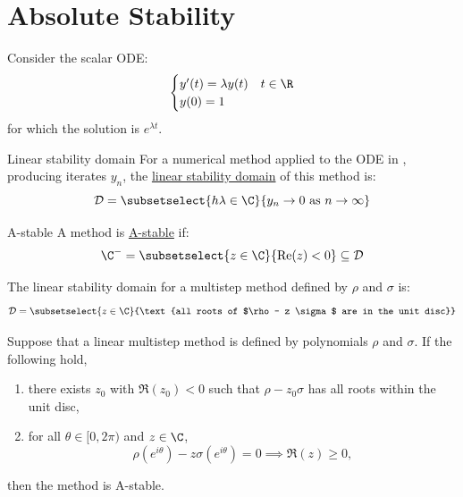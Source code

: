 \documentclass[../Main.tex]{subfiles}
\begin{document}
\section{Absolute Stability}
Consider the scalar ODE:
\begin{equation}
    \begin{cases}
        y'(t) = \lambda y(t) & t \in \R \\
        y(0) = 1 &
    \end{cases}
    \label{eqnScalarODE}
\end{equation}
for which the solution is $e^{\lambda t}$.
\begin{definition}{Linear stability domain}
    For a numerical method applied to the ODE in , producing iterates $y_n$, the \underline{linear stability domain} of this method is:
    \begin{equation*}
        \dom = \subsetselect{h\lambda \in \C}{y_n \to 0 \text{ as } n \to \infty}
    \end{equation*}
\end{definition}
\begin{definition}{A-stable}
    A method is \underline{A-stable} if:
    \begin{equation*}
        \C^- = \subsetselect{z \in \C}{\Re(z) < 0} \subseteq \dom
    \end{equation*}
\end{definition}
The linear stability domain for a multistep method defined by $\rho$ and $\sigma$ is:
\begin{equation*}
    \dom = \subsetselect{z \in \C}{\text{all roots of $\rho - z \sigma$ are in the unit disc}}
\end{equation*}
\begin{proposition}
    Suppose that a linear multistep method is defined by polynomials $\rho$ and $\sigma$. If the following hold,
    \begin{enumerate}
        \item there exists $z_0$ with $\Re(z_0) < 0$ such that $\rho - z_0 \sigma$ has all roots within the unit disc,
        \item for all $\theta \in [0, 2\pi)$ and $z \in \C$,
            \begin{equation*}
                \rho(e^{i\theta}) - z\sigma(e^{i\theta}) = 0 \implies \Re(z) \geq 0,
            \end{equation*}
    \end{enumerate}
    then the method is A-stable.
    \label{propMultiStepStability}
\end{proposition}
\end{document}
